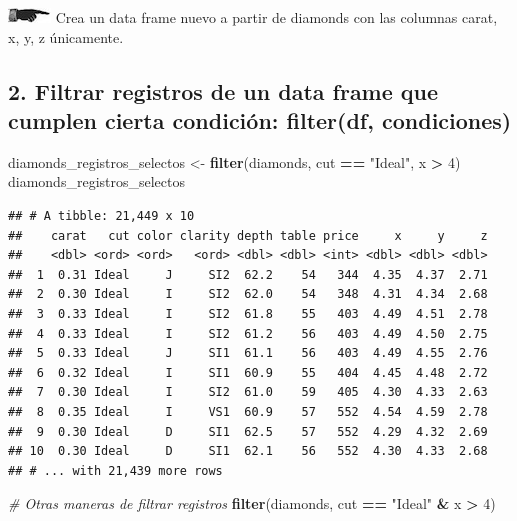 \documentclass[]{book}
\newenvironment{Shaded}{\begin{snugshade}}{\end{snugshade}}
\newcommand{\KeywordTok}[1]{\textcolor[rgb]{0.13,0.29,0.53}{\textbf{#1}}}
\newcommand{\DecValTok}[1]{\textcolor[rgb]{0.00,0.00,0.81}{#1}}
\newcommand{\StringTok}[1]{\textcolor[rgb]{0.31,0.60,0.02}{#1}}
\newcommand{\CommentTok}[1]{\textcolor[rgb]{0.56,0.35,0.01}{\textit{#1}}}
\newcommand{\OperatorTok}[1]{\textcolor[rgb]{0.81,0.36,0.00}{\textbf{#1}}}
\newcommand{\NormalTok}[1]{#1}
\theoremstyle{definition}
\theoremstyle{definition}
\theoremstyle{definition}
\theoremstyle{remark}
\begin{document}
\includegraphics{./imagenes/manicule2.jpg} Crea un data frame nuevo a
partir de diamonds con las columnas carat, x, y, z únicamente.

\subsection{2. Filtrar registros de un data frame que cumplen cierta
condición: filter(df,
condiciones)}\label{filtrar-registros-de-un-data-frame-que-cumplen-cierta-condicion-filterdf-condiciones}

\begin{Shaded}
\begin{Highlighting}[]
\NormalTok{diamonds_registros_selectos <-}\StringTok{ }\KeywordTok{filter}\NormalTok{(diamonds, cut }\OperatorTok{==}\StringTok{ "Ideal"}\NormalTok{, x }\OperatorTok{>}\StringTok{ }\DecValTok{4}\NormalTok{)}
\NormalTok{diamonds_registros_selectos}
\end{Highlighting}
\end{Shaded}

\begin{verbatim}
## # A tibble: 21,449 x 10
##    carat   cut color clarity depth table price     x     y     z
##    <dbl> <ord> <ord>   <ord> <dbl> <dbl> <int> <dbl> <dbl> <dbl>
##  1  0.31 Ideal     J     SI2  62.2    54   344  4.35  4.37  2.71
##  2  0.30 Ideal     I     SI2  62.0    54   348  4.31  4.34  2.68
##  3  0.33 Ideal     I     SI2  61.8    55   403  4.49  4.51  2.78
##  4  0.33 Ideal     I     SI2  61.2    56   403  4.49  4.50  2.75
##  5  0.33 Ideal     J     SI1  61.1    56   403  4.49  4.55  2.76
##  6  0.32 Ideal     I     SI1  60.9    55   404  4.45  4.48  2.72
##  7  0.30 Ideal     I     SI2  61.0    59   405  4.30  4.33  2.63
##  8  0.35 Ideal     I     VS1  60.9    57   552  4.54  4.59  2.78
##  9  0.30 Ideal     D     SI1  62.5    57   552  4.29  4.32  2.69
## 10  0.30 Ideal     D     SI1  62.1    56   552  4.30  4.33  2.68
## # ... with 21,439 more rows
\end{verbatim}

\begin{Shaded}
\begin{Highlighting}[]
\CommentTok{# Otras maneras de filtrar registros}
\KeywordTok{filter}\NormalTok{(diamonds, cut }\OperatorTok{==}\StringTok{ "Ideal"} \OperatorTok{&}\StringTok{ }\NormalTok{x }\OperatorTok{>}\StringTok{ }\DecValTok{4}\NormalTok{)}
\end{Highlighting}
\end{Shaded}
\end{document}
